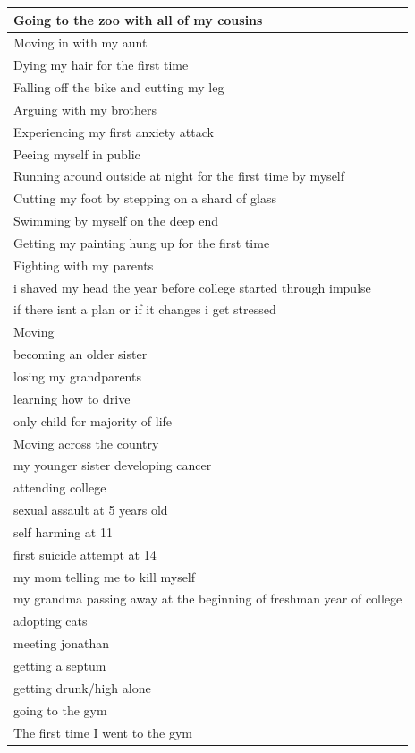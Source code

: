\documentclass[
  .7em,
  letterpaper,
  DIV=11,
  numbers=noendperiod]{scrartcl}
\begin{document}
\begin{table}
\begin{tabular}{l}
\hline
Going to the zoo with all of my cousins\\
\hline
Moving in with my aunt\\
\hline
Dying my hair for the first time\\
\hline
Falling off the bike and cutting my leg\\
\hline
Arguing with my brothers\\
\hline
Experiencing my first anxiety attack\\
\hline
Peeing myself in public\\
\hline
Running around outside at night for the first time by myself\\
\hline
Cutting my foot by stepping on a shard of glass\\
\hline
Swimming by myself on the deep end\\
\hline
Getting my painting hung up for the first time\\
\hline
Fighting with my parents\\
\hline
i shaved my head the year before college started through impulse\\
\hline
if there isnt a plan or if it changes i get stressed\\
\hline
Moving\\
\hline
becoming an older sister\\
\hline
losing my grandparents\\
\hline
learning how to drive\\
\hline
only child for majority of life\\
\hline
Moving across the country\\
\hline
my younger sister developing cancer\\
\hline
attending college\\
\hline
sexual assault at 5 years old\\
\hline
self harming at 11\\
\hline
first suicide attempt at 14\\
\hline
my mom telling me to kill myself\\
\hline
my grandma passing away at the beginning of freshman year of college\\
\hline
adopting cats\\
\hline
meeting jonathan\\
\hline
getting a septum\\
\hline
getting drunk/high alone\\
\hline
going to the gym\\
\hline
The first time I went to the gym\\

\end{tabular}
\end{table}
\end{document}
